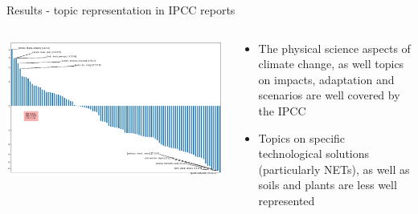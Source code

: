 \documentclass[9pt]{beamer}
\begin{document}
\begin{frame}{Results - topic representation in IPCC reports}

\begin{columns}
	\begin{column}{0.7\linewidth}
		\begin{center}
			\includegraphics[width=\linewidth]{../plots/ipcc_representation/ipcc_rep_662_AR6.png}
		\end{center}
	\end{column}
	\begin{column}{0.3\linewidth}
		\begin{center}
			\begin{itemize}
				\item The physical science aspects of climate change, as well topics on impacts, adaptation and scenarios are well covered by the IPCC
				\item Topics on specific technological solutions (particularly NETs), as well as soils and plants are less well represented
			\end{itemize}
		\end{center}
	\end{column}
\end{columns}

\end{frame}


\end{document}
